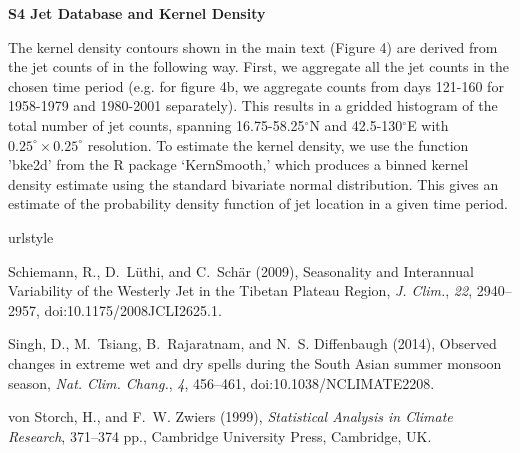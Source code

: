 \documentclass[draft,grl]{agutexSI}
\begin{document}
\begin{article}
\vspace{5mm}

\noindent\textbf{{\Large S4 Jet Database and Kernel Density}}

\vspace{2mm}

The kernel density contours shown in the main text (Figure 4) are derived from the jet counts of \citet{Schiemann2009} in the following way. First, we aggregate all the jet counts in the chosen time period (e.g. for figure 4b, we aggregate counts from days 121-160 for 1958-1979 and 1980-2001 separately). This results in a gridded histogram of the total number of jet counts, spanning 16.75-58.25$^{\circ}$N and 42.5-130$^{\circ}$E with $0.25^{\circ} \times 0.25^{\circ}$ resolution. To estimate the kernel density, we use the function 'bke2d' from the R package `KernSmooth,' which produces a binned kernel density estimate using the standard bivariate normal distribution. This gives an estimate of the probability density function of jet location in a given time period. 



%
%

\begin{thebibliography}{4}
\providecommand{\natexlab}[1]{#1}
\expandafter\ifx\csname urlstyle\endcsname\relax
  \providecommand{\doi}[1]{doi:\discretionary{}{}{}#1}\else
  \providecommand{\doi}{doi:\discretionary{}{}{}\begingroup
  \urlstyle{rm}\Url}\fi

Schiemann, R., D.~L\"{u}thi, and C.~Sch\"{a}r (2009), {Seasonality and
  Interannual Variability of the Westerly Jet in the Tibetan Plateau Region},
  \textit{J. Clim.}, \textit{22}, 2940--2957, \doi{10.1175/2008JCLI2625.1}.

Singh, D., M.~Tsiang, B.~Rajaratnam, and N.~S. Diffenbaugh (2014), {Observed
  changes in extreme wet and dry spells during the South Asian summer monsoon
  season}, \textit{Nat. Clim. Chang.}, \textit{4}, 456--461,
  \doi{10.1038/NCLIMATE2208}.

von Storch, H., and F.~W. Zwiers (1999), \textit{{Statistical Analysis in
  Climate Research}}, 371--374 pp., Cambridge University Press, Cambridge, UK.


\end{thebibliography}
\end{article}
\end{document}
